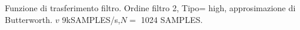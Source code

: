 Funzione di trasferimento filtro. Ordine filtro 2, Tipo= high, approsimazione di Butterworth. $v$ 9kSAMPLES/s,$N=$ 1024 SAMPLES.